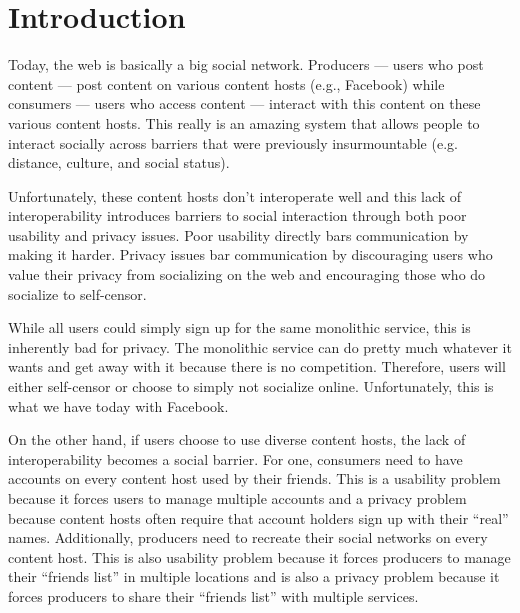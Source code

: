 \documentclass[pdftex,12pt,a4papaer,twoside,notitlepage]{report}
\begin{document}
\restoregeometry

\cleardoublepage

\tableofcontents

\cleardoublepage

\setlength{\parskip}{1.5em}
                                              
\chapter{Introduction} 

Today, the web is basically a big social network. Producers --- users who post
content --- post content on various content hosts (e.g., Facebook) while
consumers --- users who access content --- interact with this content on these
various content hosts. This really is an amazing system that allows people to
interact socially across barriers that were previously insurmountable (e.g.
distance, culture, and social status).

Unfortunately, these content hosts don't interoperate well and this lack of
interoperability introduces barriers to social interaction through both poor
usability and privacy issues. Poor usability directly bars communication by
making it harder. Privacy issues bar communication by discouraging users who
value their privacy from socializing on the web and encouraging those who do
socialize to self-censor.

While all users could simply sign up for the same monolithic service, this is
inherently bad for privacy. The monolithic service can do pretty much whatever
it wants and get away with it because there is no competition. Therefore, users
will either self-censor or choose to simply not socialize online. Unfortunately,
this is what we have today with Facebook.

On the other hand, if users choose to use diverse content hosts, the lack of
interoperability becomes a social barrier. For one, consumers need to have
accounts on every content host used by their friends. This is a usability
problem because it forces users to manage multiple accounts and a privacy
problem because content hosts often require that account holders sign up with
their ``real'' names. Additionally, producers need to recreate their social
networks on every content host. This is also usability problem because it forces
producers to manage their ``friends list'' in multiple locations and is also a
privacy problem because it forces producers to share their ``friends list'' with
multiple services.
\end{document}
